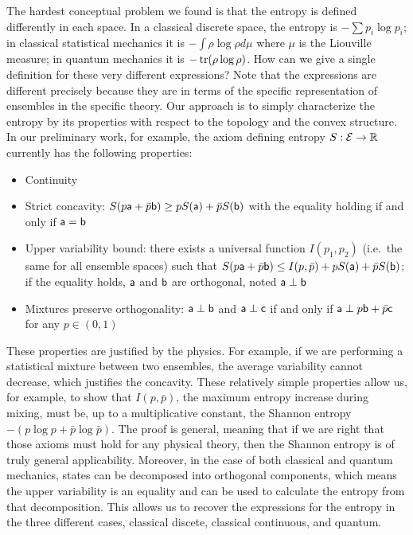 The hardest conceptual problem we found is that the entropy is defined differently in each space. In a classical discrete space, the entropy is $-\sum p_i \log p_i$; in classical statistical mechanics it is $- \int \rho \log \rho d\mu$ where $\mu$ is the Liouville measure; in quantum mechanics it is $-\tr(\rho \log \rho)$. How can we give a single definition for these very different expressions? Note that the expressions are different precisely because they are in terms of the specific representation of ensembles in the specific theory. Our approach is to simply characterize the entropy by its properties with respect to the topology and the convex structure. In our preliminary work, for example, the axiom defining entropy $S : \Ens \to \mathbb{R}$ currently has the following properties:
\begin{itemize}
	\item Continuity
	\item Strict concavity: $S(p\ens[a] + \bar{p} \ens[b]) \geq p S(\ens[a]) + \bar{p} S(\ens[b])$ with the equality holding if and only if $\ens[a] = \ens[b]$
	\item Upper variability bound: there exists a universal function $I(p_1, p_2)$ (i.e.~the same for all ensemble spaces) such that $S(p\ens[a] + \bar{p} \ens[b]) \leq I(p, \bar{p}) + p S(\ens[a]) + \bar{p} S(\ens[b])$; if the equality holds, $\ens[a]$ and $\ens[b]$ are orthogonal, noted $\ens[a] \ortho \ens[b]$
	\item Mixtures preserve orthogonality: $\ens[a] \ortho \ens[b]$ and $\ens[a] \ortho \ens[c]$ if and only if $\ens[a] \ortho p \ens[b] + \bar{p} \ens[c]$ for any $p \in (0,1)$
\end{itemize}
These properties are justified by the physics. For example, if we are performing a statistical mixture between two ensembles, the average variability cannot decrease, which justifies the concavity. These relatively simple properties allow us, for example, to show that $I(p,\bar{p})$, the maximum entropy increase during mixing, must be, up to a multiplicative constant, the Shannon entropy~\cite{Shannon} $ - \left(p \log p + \bar{p} \log \bar{p}\right)$. The proof is general, meaning that if we are right that those axioms must hold for any physical theory, then the Shannon entropy is of truly general applicability. Moreover, in the case of both classical and quantum mechanics, states can be decomposed into orthogonal components, which means the upper variability is an equality and can be used to calculate the entropy from that decomposition. This allows us to recover the expressions for the entropy in the three different cases, classical discete, classical continuous, and quantum.

